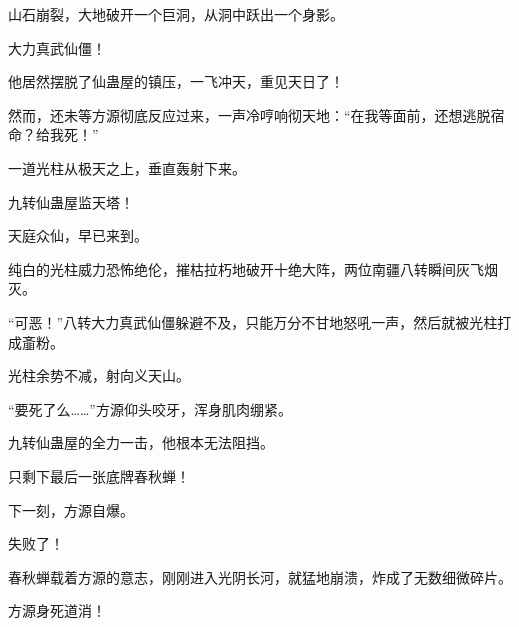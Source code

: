 \begin{this_body}
山石崩裂，大地破开一个巨洞，从洞中跃出一个身影。

大力真武仙僵！

他居然摆脱了仙蛊屋的镇压，一飞冲天，重见天日了！

然而，还未等方源彻底反应过来，一声冷哼响彻天地：“在我等面前，还想逃脱宿命？给我死！”

一道光柱从极天之上，垂直轰射下来。

九转仙蛊屋监天塔！

天庭众仙，早已来到。

纯白的光柱威力恐怖绝伦，摧枯拉朽地破开十绝大阵，两位南疆八转瞬间灰飞烟灭。

“可恶！”八转大力真武仙僵躲避不及，只能万分不甘地怒吼一声，然后就被光柱打成齑粉。

光柱余势不减，射向义天山。

“要死了么……”方源仰头咬牙，浑身肌肉绷紧。

九转仙蛊屋的全力一击，他根本无法阻挡。

只剩下最后一张底牌春秋蝉！

下一刻，方源自爆。

失败了！

春秋蝉载着方源的意志，刚刚进入光阴长河，就猛地崩溃，炸成了无数细微碎片。

方源身死道消！

\end{this_body}

